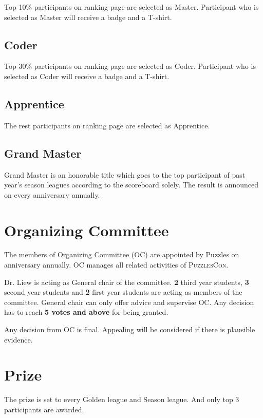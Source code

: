 \documentclass{article}
\begin{document}
Top 10\% participants on ranking page are selected as Master. Participant who is selected as Master will receive a badge and a T-shirt.

\subsection{Coder}

Top 30\% participants on ranking page are selected as Coder. Participant who is selected as Coder will receive a badge and a T-shirt.

\subsection{Apprentice}

The rest participants on ranking page are selected as Apprentice.

\subsection{Grand Master}

Grand Master is an honorable title which goes to the top participant of past year's season leagues according to the scoreboard solely. The result is announced on every anniversary annually.

\section{Organizing Committee}

The members of Organizing Committee (OC) are appointed by Puzzles on anniversary annually. OC manages all related activities of \textsc{PuzzlesCon}.

Dr. Liew is acting as General chair of the committee. \textbf{2} third year students, \textbf{3} second year students and \textbf{2} first year students are acting as members of the committee. General chair can only offer advice and supervise OC. Any decision has to reach \textbf{5 votes and above} for being granted.

Any decision from OC is final. Appealing will be considered if there is plausible evidence.

\section{Prize}

The prize is set to every Golden league and Season league. And only top 3 participants are awarded.
\end{document}
